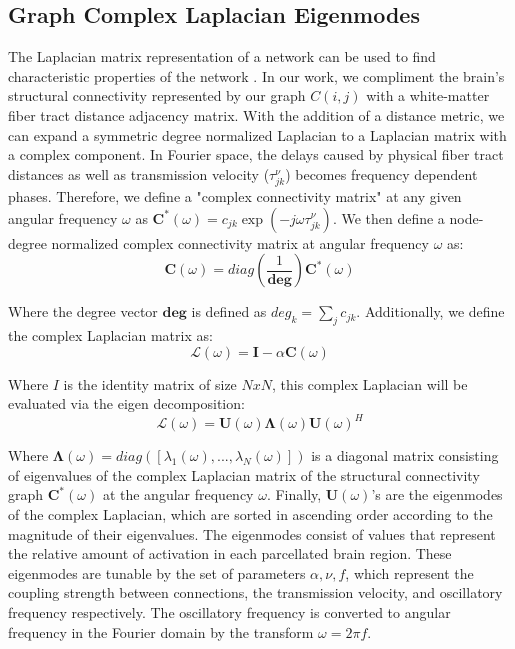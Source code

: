 \documentclass{article}
\begin{document}
\subsection{Graph Complex Laplacian Eigenmodes}
The Laplacian matrix representation of a network can be used to find characteristic properties of the network \cite{Stewart1999}. In our work, we compliment the brain's structural connectivity represented by our graph $C(i,j)$ with a white-matter fiber tract distance adjacency matrix. With the addition of a distance metric, we can expand a symmetric degree normalized Laplacian to a Laplacian matrix with a complex component. In Fourier space, the delays caused by physical fiber tract distances as well as transmission velocity ($\tau^{\nu}_{jk}$) becomes frequency dependent phases. Therefore, we define a "complex connectivity matrix" at any given angular frequency $\omega$ as $\bm{C^{*}}(\omega) = c_{jk} \exp{(-j\omega \tau^{\nu}_{jk})}$. We then define a node-degree normalized complex connectivity matrix at angular frequency $\omega$ as:
\begin{equation}
\bm{C}(\omega) = diag(\frac{1}{\bm{deg}}) \bm{C^*}(\omega)    
\end{equation}

Where the degree vector $\bm{deg}$ is defined as $deg_{k} = \sum_{j}c_{jk}$. Additionally, we define the complex Laplacian matrix as:
\begin{equation}
\bm{\mathcal{L}}(\omega) = \bm{I} - \alpha \bm{C}(\omega)
\end{equation}

Where $I$ is the identity matrix of size $N x N$, this complex Laplacian will be evaluated via the eigen decomposition:
\begin{equation}
    \bm{\mathcal{L}}(\omega) = \bm{U}(\omega)\bm{\Lambda}(\omega)\bm{U}(\omega)^{H}
\end{equation}

Where $\bm{\Lambda}(\omega) = diag([\lambda_{1}(\omega), ... , \lambda_{N}(\omega)])$ is a diagonal matrix consisting of eigenvalues of the complex Laplacian matrix of the structural connectivity graph $\bm{C^*}(\omega)$ at the angular frequency $\omega$. Finally, $\bm{U}(\omega)$'s are the eigenmodes of the complex Laplacian, which are sorted in ascending order according to the magnitude of their eigenvalues. The eigenmodes consist of values that represent the relative amount of activation in each parcellated brain region. These eigenmodes are tunable by the set of parameters ${\alpha, \nu, f}$, which represent the coupling strength between connections, the transmission velocity, and oscillatory frequency respectively. The oscillatory frequency is converted to angular frequency in the Fourier domain by the transform $\omega = 2 \pi f$. 
\end{document}
